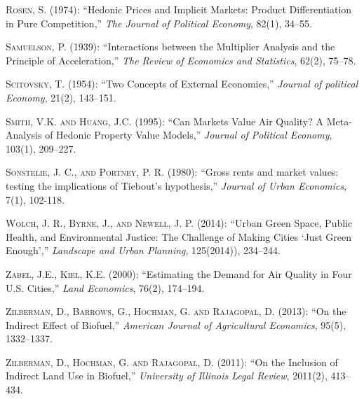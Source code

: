 \documentclass[ecta,nameyear,draft]{econsocart}
\theoremstyle{plain}
\theoremstyle{remark}
\begin{document}
\begin{thebibliography}{}
\textsc{Rosen, S.} (1974):
``Hedonic Prices and Implicit Markets: Product Differentiation in Pure Competition,''
\textit{The Journal of Political Economy}, 82(1), 34--55.
\endbibitem

\textsc{Samuelson, P.} (1939):
``Interactions between the Multiplier Analysis and the Principle of Acceleration,''
\textit{The Review of Economics and Statistics}, 62(2), 75--78.
\endbibitem

\textsc{Scitovsky, T.} (1954):
``Two Concepts of External Economies,''
\textit{Journal of political Economy}, 21(2), 143--151.
\endbibitem


\textsc{Smith, V.K. and Huang, J.C.} (1995):
``Can Markets Value Air Quality? A Meta-Analysis of Hedonic Property Value Models,''
\textit{Journal of Political Economy}, 103(1), 209--227.
\endbibitem


\textsc{Sonstelie, J. C., and Portney, P. R.} (1980):
``Gross rents and market values: testing the implications of Tiebout's hypothesis,''
\textit{Journal of Urban Economics}, 7(1), 102-118.
\endbibitem


\textsc{Wolch, J. R., Byrne, J., and Newell, J. P.} (2014):
``Urban Green Space, Public Health, and Environmental Justice: The Challenge of Making Cities ‘Just Green Enough’,''
\textit{Landscape and Urban Planning}, 125(2014)), 234--244.
\endbibitem



\textsc{Zabel, J.E., Kiel, K.E.} (2000):
``Estimating the Demand for Air Quality in Four U.S. Cities,''
\textit{Land Economics}, 76(2), 174--194.
\endbibitem

\textsc{Zilberman, D., Barrows, G., Hochman, G. and Rajagopal, D.} (2013):
``On the Indirect Effect of Biofuel,''
\textit{American Journal of Agricultural Economics}, 95(5), 1332--1337.
\endbibitem

\textsc{Zilberman, D., Hochman, G. and Rajagopal, D.} (2011):
``On the Inclusion of Indirect Land Use in Biofuel,''
\textit{University of Illinois Legal Review}, 2011(2), 413--434.
\endbibitem


\end{thebibliography}
\end{document}
